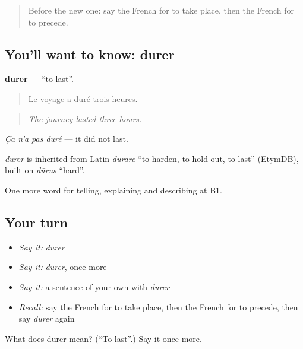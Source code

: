 \label{lesson:FR-C274-durer}



\begin{quote}
Before the new one: say the French for to take place, then the French for to precede.
\end{quote}

\subsection*{You'll want to know: durer}
\textbf{durer} — \textquotedblleft{}to last\textquotedblright{}.

\begin{quote}
Le voyage a duré trois heures.
\end{quote}

\begin{quote}
\emph{The journey lasted three hours.}
\end{quote}

\emph{Ça n'a pas duré} — it did not last.

\begin{cousinweb}
\emph{durer} is inherited from Latin \emph{dūrāre} \textquotedblleft{}to harden, to hold out, to last\textquotedblright{} (EtymDB), built on \emph{dūrus} \textquotedblleft{}hard\textquotedblright{}.
\end{cousinweb}

\begin{grammarlens}[title={What you've built}]
One more word for telling, explaining and describing at B1.
\end{grammarlens}

\subsection*{Your turn}
\begin{itemize}
\raggedright
  \item \emph{Say it:} \emph{durer}
  \item \emph{Say it:} \emph{durer}, once more
  \item \emph{Say it:} a sentence of your own with \emph{durer}
  \item \emph{Recall:} say the French for to take place, then the French for to precede, then say \emph{durer} again
\end{itemize}

\begin{tcolorbox}[breakable,colback=teal!4,colframe=teal!35!black,title={Before you move on}]
What does durer mean? (\textquotedblleft{}To last\textquotedblright{}.) Say it once more.
\end{tcolorbox}
